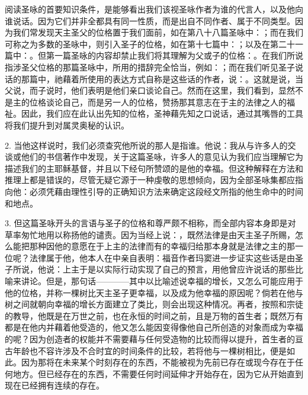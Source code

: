 阅读圣咏的首要知识条件，是能够看出我们该视圣咏作者为谁的代言人，以及他向谁说话。因为它们并非全都具有同一性质，而是出自不同作者、属于不同类型。因为我们常发现天主圣父的位格置于我们面前，如在第八十八篇圣咏中：；而在我们可称之为多数的圣咏中，则引入圣子的位格，如在第十七篇中：；以及在第二十一篇中：。但第一篇圣咏的内容却禁止我们将其理解为父或子的位格：。在我们所说指涉圣父位格的那篇圣咏中，所用的措辞完全恰当，例如：；而在我们听见圣子说话的那篇中，祂藉着所使用的表达方式自称是这些话的作者，说：。这就是说，当父说，而子说时，他们表明是他们亲口谈论自己。然而在这里，我们看到，显然不是主的位格谈论自己，而是另一人的位格，赞扬那其意志在于主的法律之人的福祉。因此，我们应在此认出先知的位格，圣神藉先知之口说话，通过其嘴唇的工具将我们提升到对属灵奥秘的认识。\par

2. 当他这样说时，我们必须查究他所说的那人是指谁。他说：我从与许多人的交谈或他们的书信著作中发现，关于这篇圣咏，许多人的意见认为我们应当理解它为描述我们的主耶稣基督，并且以下经句所赞颂的是他的幸福。但这种解释在方法和推理上都是错误的，尽管无疑它源于一种虔敬的思想倾向，因为全部圣咏集都应指向他：必须凭藉由理性引导的正确知识方法来确定这段经文所指的他生命中的时间和地点。\par

3. 但这篇圣咏开头的言语与圣子的位格和尊严颇不相称，而全部内容本身即是对草率匆忙地用以称扬他的谴责。因为当经上说：，既然法律是由天主圣子所赐，怎么能把那种因他的意愿在于上主的法律而有的幸福归给那本身就是法律之主的那一位呢？法律属于他，他本人在中亲自表明：福音作者玛窦进一步证实这些话是由圣子所说，他说：上主于是以实际行动实现了自己的预言，用他曾应许说话的那些比喻来讲论。但是，那句话————其中以比喻述说幸福的增长，又怎么可能应用于他的位格，并称一棵树比天主圣子更幸福，以及成为他幸福的原因呢？倘若在他与树之间就朝向幸福的增长方面建立了类比，则会出现这种情况。再者，按照和宗徒的教导，他既是在万世之前，也在永恒的时间之前，且是万物的首生者；既然万有都是在他内并藉着他受造的，他又怎么能因变得像他自己所创造的对象而成为幸福的呢？因为创造者的权能并不需要藉与任何受造物的比较而得以提升，首生者的亘古年龄也不容许涉及不合时宜的时间条件的比较，若将他与一棵树相比，便是如此。因为那将在未来某个时刻存在的东西，不能被视为先前已存在或现今存在于任何地方。但已经存在的东西，不需要任何时间延伸才开始存在，因为它从开始直到现在已经拥有连续的存在。\par

